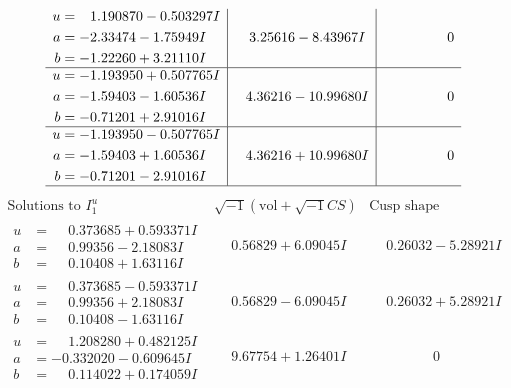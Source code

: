 \documentclass[1p]{elsarticle_modified}
\theoremstyle{definition}
\newcommand{\I}{\sqrt{-1}}
\begin{document}
$$\begin{array}{c|c|c}
\begin{aligned}
u &= \phantom{-}1.190870 - 0.503297 I \\
a &= -2.33474 - 1.75949 I \\
b &= -1.22260 + 3.21110 I\end{aligned}
 & \phantom{-}3.25616 - 8.43967 I & \phantom{-0.000000 } 0 \\ \hline\begin{aligned}
u &= -1.193950 + 0.507765 I \\
a &= -1.59403 - 1.60536 I \\
b &= -0.71201 + 2.91016 I\end{aligned}
 & \phantom{-}4.36216 - 10.99680 I & \phantom{-0.000000 } 0 \\ \hline\begin{aligned}
u &= -1.193950 - 0.507765 I \\
a &= -1.59403 + 1.60536 I \\
b &= -0.71201 - 2.91016 I\end{aligned}
 & \phantom{-}4.36216 + 10.99680 I & \phantom{-0.000000 } 0\\
 \hline 
 \end{array}$$\newpage$$\begin{array}{c|c|c}  
\text{Solutions to }I^u_{1}& \I (\text{vol} + \sqrt{-1}CS) & \text{Cusp shape}\\
 \hline 
\begin{aligned}
u &= \phantom{-}0.373685 + 0.593371 I \\
a &= \phantom{-}0.99356 - 2.18083 I \\
b &= \phantom{-}0.10408 + 1.63116 I\end{aligned}
 & \phantom{-}0.56829 + 6.09045 I & \phantom{-}0.26032 - 5.28921 I \\ \hline\begin{aligned}
u &= \phantom{-}0.373685 - 0.593371 I \\
a &= \phantom{-}0.99356 + 2.18083 I \\
b &= \phantom{-}0.10408 - 1.63116 I\end{aligned}
 & \phantom{-}0.56829 - 6.09045 I & \phantom{-}0.26032 + 5.28921 I \\ \hline\begin{aligned}
u &= \phantom{-}1.208280 + 0.482125 I \\
a &= -0.332020 - 0.609645 I \\
b &= \phantom{-}0.114022 + 0.174059 I\end{aligned}
 & \phantom{-}9.67754 + 1.26401 I & \phantom{-0.000000 } 0 \\ \hline\begin{aligned}

\end{aligned}
\end{array}$$
\end{document}
